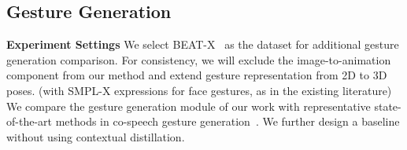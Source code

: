 \begin{table}[ht]
    \caption{Quantitative results on BEAT-X. 
    FGD (Frechet Gesture Distance) multiplied by \( 10^{-1} \), BC (Beat Constancy) multiplied by \( 10^{-1} \), Diversity, MSE (Mean Squared Error) multiplied by \( 10^{-7} \).
    The best results are in bold. }
    \label{tab:tab4}
    \centering
\end{table}

\subsection{Gesture Generation}
\noindent\textbf{Experiment Settings}
We select BEAT-X~\cite{liu2023emage} as the dataset for additional gesture generation comparison. For consistency, we will exclude the image-to-animation component from our method and extend gesture representation from 2D to 3D poses. (with SMPL-X expressions for face gestures, as in the existing literature) We compare the gesture generation module of our work with representative state-of-the-art methods in co-speech gesture generation~\cite{ao2022rhythmic, yi2022generating, liu2023emage}. We further design a baseline without using contextual distillation.

